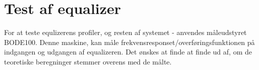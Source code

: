 \chapter{Test af equalizer}\label{sec:test_eq}

For at teste equlizerens profiler, og resten af systemet - anvendes måleudstyret BODE100. Denne maskine, kan måle frekvensresponset/overføringsfunktionen på indgangen og udgangen af equalizeren. Det ønskes at finde at finde ud af, om de teoretiske beregninger stemmer overens med de målte.



